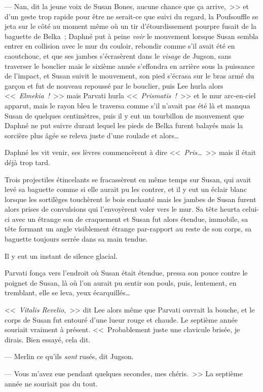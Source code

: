 --- Nan, dit la jeune voix de Susan Bones, aucune chance que ça arrive,~>> et d'un geste trop rapide pour être ne serait-ce que suivi du regard, la Poufsouffle se jeta sur le côté au moment même où un tir d'étourdissement pourpre fusait de la baguette de Belka~; Daphné put à peine \emph{voir} le mouvement lorsque Susan sembla entrer en collision avec le mur du couloir, rebondir comme s'il avait été en caoutchouc, et que ses jambes s'écrasèrent dans le \emph{visage} de Jugson, sans traverser le bouclier mais le sixième année s'effondra en arrière sous la puissance de l'impact, et Susan suivit le mouvement, son pied s'écrasa sur le bras armé du garçon et fut de nouveau repoussé par le bouclier, puis Lee hurla alors <<~\emph{Elmekia~!}~>> mais Parvati hurla <<~\emph{Prismatis~!}~>> et le mur arc-en-ciel apparut, mais le rayon bleu le traversa comme s'il n'avait pas été là et manqua Susan de quelques centimètres, puis il y eut un tourbillon de mouvement que Daphné ne put suivre durant lequel les pieds de Belka furent balayés mais la sorcière plus âgée se releva juste d'une roulade et alors…

Daphné les vit venir, ses lèvres commencèrent à dire <<~\emph{Pris…}~>> mais il était déjà trop tard.

Trois projectiles étincelants se fracassèrent en même temps sur Susan, qui avait levé sa baguette comme si elle aurait pu les contrer, et il y eut un éclair blanc lorsque les sortilèges touchèrent le bois enchanté mais les jambes de Susan furent alors prises de convulsions qui l'envoyèrent voler vers le mur. Sa tête heurta celui-ci avec un étrange son de craquement et Susan fut alors étendue, immobile, sa tête formant un angle visiblement étrange par-rapport au reste de son corps, sa baguette toujours serrée dans sa main tendue.

Il y eut un instant de silence glacial.

Parvati fonça vers l'endroit où Susan était étendue, pressa son pouce contre le poignet de Susan, là où l'on aurait pu sentir son pouls, puis, lentement, en tremblant, elle se leva, yeux écarquillés…

<<~\emph{Vitalis Revelio},~>> dit Lee alors même que Parvati ouvrait la bouche, et le corps de Susan fut entouré d'une lueur rouge et chaude. Le septième année souriait vraiment à présent. <<~Probablement juste une clavicule brisée, je dirais. Bien essayé, cela dit.

--- Merlin ce qu'ils \emph{sont} rusés, dit Jugson.

--- Vous m'avez eue pendant quelques secondes, mes chéris.~>> La septième année ne souriait pas du tout.

